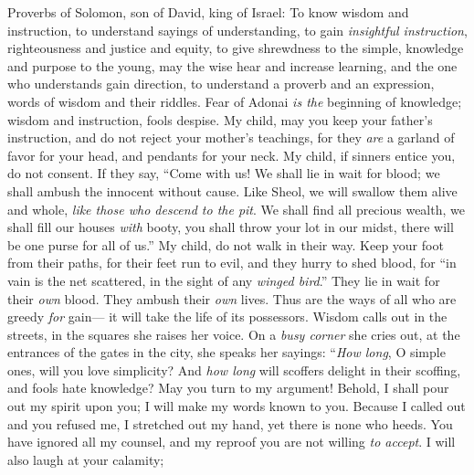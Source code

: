 
\begin{biblechapter} %
 Proverbs of Solomon, son of David, king of Israel:
\verse To know wisdom and instruction, 
to understand sayings of understanding,
\verse to gain \textit{insightful instruction}, 
righteousness and justice and equity,
\verse to give shrewdness to the simple, 
knowledge and purpose to the young,
\verse may the wise hear and increase learning, 
and the one who understands gain direction,
\verse to understand a proverb and an expression, 
words of wisdom and their riddles.
\verse Fear of Adonai \textit{is the} beginning of knowledge; 
wisdom and instruction, fools despise.
 My child, may you keep your father’s instruction, 
and do not reject your mother’s teachings,
\verse for they \textit{are} a garland of favor for your head, 
and pendants for your neck.
\verse My child, if sinners entice you, do not consent.
\verse If they say, 
“Come with us! 
We shall lie in wait for blood; 
we shall ambush the innocent without cause.
\verse Like Sheol, we will swallow them alive 
and whole, \textit{like those who descend to the pit}.
\verse We shall find all precious wealth, 
we shall fill our houses \textit{with} booty,
\verse you shall throw your lot in our midst, 
there will be one purse for all of us.”
\verse My child, do not walk in their way. 
Keep your foot from their paths,
\verse for their feet run to evil, 
and they hurry to shed blood,
\verse for “in vain is the net scattered, 
in the sight of any \textit{winged bird}.”
\verse They lie in wait for their \textit{own} blood. 
They ambush their \textit{own} lives.
\verse Thus are the ways of all who are greedy \textit{for} gain— 
it will take the life of its possessors.
 Wisdom calls out in the streets, 
in the squares she raises her voice.
\verse On a \textit{busy corner} she cries out, 
at the entrances of the gates in the city, she speaks her sayings:
\verse “\textit{How long}, O simple ones, will you love simplicity? 
And \textit{how long} will scoffers delight in their scoffing, 
and fools hate knowledge?
\verse May you turn to my argument! 
Behold, I shall pour out my spirit upon you; 
I will make my words known to you.
\verse Because I called out and you refused me, 
I stretched out my hand, yet there is none who heeds.
\verse You have ignored all my counsel, 
and my reproof you are not willing \textit{to accept}.
\verse I will also laugh at your calamity; 

\end{biblechapter}
